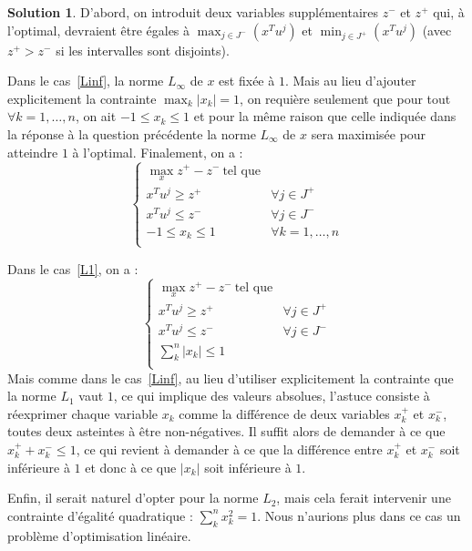 \documentclass[a4paper,francais]{article}
\theoremstyle{definition}
\newtheorem*{solution}{Solution}
\begin{document}
\begin{solution}
  D'abord, on introduit deux variables supplémentaires
  $z^-$ et $z^+$ qui, à l'optimal, devraient être égales
  à $\max_{j \in J^-} (x^T u^j)$ et $\min_{j \in J^+} (x^T u^j)$
  (avec $z^+ > z^-$ si les intervalles sont disjoints).
  
  Dans le cas~\ref{Linf}, la norme $L_\infty$ de $x$ est fixée à $1$.
  Mais au lieu d'ajouter explicitement la contrainte $\max_k |x_k| = 1$,
  on requière seulement que pour tout $\forall k = 1, \dots, n$, on ait
  $-1 \leq x_k \leq 1$ et pour la même raison que celle indiquée dans
  la réponse à la question précédente la norme $L_\infty$ de $x$ sera maximisée
  pour atteindre $1$ à l'optimal. Finalement, on a :  
  \[
  \left\{
  \begin{array}{ll}
    \max_x z^+ - z^- \ \text{tel que} & \\
    x^T u^j \geq z^+ & \forall j \in J^+ \\ 
    x^T u^j \leq z^- & \forall j \in J^- \\
    -1 \leq x_k \leq 1 & \forall k = 1, \dots, n \\
  \end{array}
  \right.
  \]

  Dans le cas~\ref{L1}, on a : 
  \[
  \left\{
  \begin{array}{ll}
    \max_x z^+ - z^- \ \text{tel que} & \\
    x^T u^j \geq z^+ & \forall j \in J^+ \\ 
    x^T u^j \leq z^- & \forall j \in J^- \\
    \sum_k^n |x_k| \leq 1 \\
  \end{array}
  \right.
  \]
  Mais comme dans le cas~\ref{Linf}, au lieu d'utiliser explicitement la contrainte
  que la norme $L_1$ vaut $1$, ce qui implique des valeurs absolues, l'astuce consiste
  à réexprimer chaque variable $x_k$ comme la différence de deux variables $x_k^+$ et
  $x_k^-$, toutes deux asteintes à être non-négatives. Il suffit alors de demander à
  ce que $x_k^+ + x_k^- \leq 1$, ce qui revient à demander à ce que la différence
  entre $x_k^+$ et $x_k^-$ soit inférieure à $1$ et donc à ce que $|x_k|$ soit inférieure
  à $1$.

  Enfin, il serait naturel d'opter pour la norme $L_2$, mais cela ferait intervenir
  une contrainte d'égalité quadratique : $\sum_k^n x_k^2 = 1$. Nous n'aurions plus dans
  ce cas un problème d'optimisation linéaire. 
\end{solution}
\end{document}
